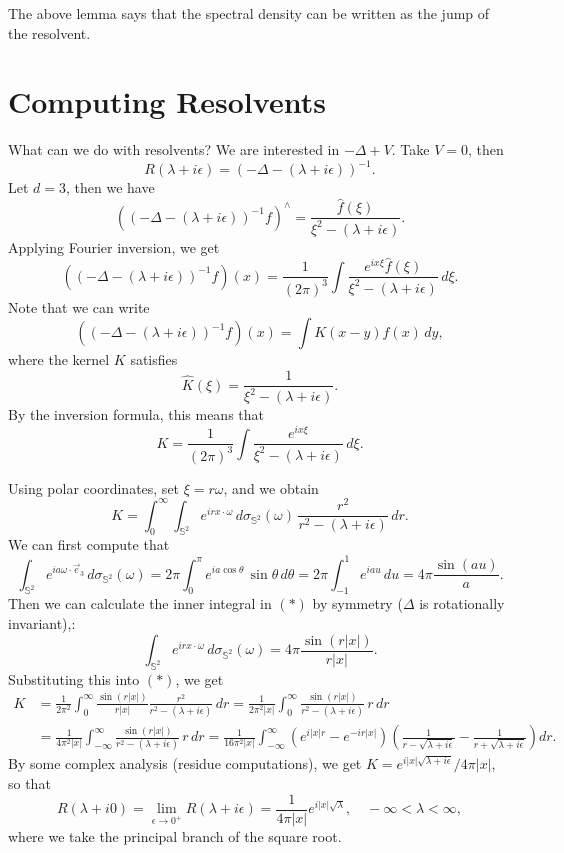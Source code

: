 \begin{remark}
  The above lemma says that the spectral density can
  be written as the jump of the resolvent.
\end{remark}

\section{Computing Resolvents}
\begin{remark}
  What can we do with resolvents? We are interested
  in $- \Delta + V$. Take $V = 0$, then
  \[
    R(\lambda + i\epsilon)
    = (-\Delta - (\lambda + i\epsilon))^{-1}.
  \]
  Let $d = 3$, then we have
  \[
    ((-\Delta - (\lambda + i\epsilon))^{-1} f)^\wedge
    = \frac{\widehat{f}(\xi)}{\xi^2 - (\lambda + i\epsilon)}.
  \]
  Applying Fourier inversion, we get
  \[
    ((-\Delta - (\lambda + i\epsilon))^{-1} f)(x)
    = \frac{1}{(2\pi)^3} \int \frac{e^{ix\xi} \widehat{f}(\xi)}{\xi^2 - (\lambda + i\epsilon)}\, d\xi.
  \]
  Note that we can write
  \[
    ((-\Delta - (\lambda + i\epsilon))^{-1} f)(x)
    = \int K(x - y) f(x)\, dy,
  \]
  where the kernel $K$ satisfies
  \[
    \widehat{K}(\xi) =
    \frac{1}{\xi^2 - (\lambda + i\epsilon)}.
  \]
  By the inversion formula, this means that
  \[
    K = \frac{1}{(2\pi)^3} \int \frac{e^{ix\xi}}{\xi^2 - (\lambda + i\epsilon)}\, d\xi.
  \]

  Using polar coordinates, set $\xi = r \omega$, and
  we obtain
  \[
    K
    = \int_0^\infty \int_{\mathbb{S}^2} e^{i r x \cdot \omega}\, d \sigma_{\mathbb{S}^2}(\omega)\,
    \frac{r^2}{r^2 - (\lambda + i\epsilon)}\, dr. \tag{$*$}
  \]
  We can first compute that
  \[
    \int_{\mathbb{S}^2} e^{ia \omega \cdot \vec{e}_3}\, d \sigma_{\mathbb{S}^2}(\omega)
    = 2\pi \int_0^\pi e^{ia \cos \theta}\, \sin \theta\, d\theta
    = 2\pi \int_{-1}^1 e^{ia u}\, du
    = 4\pi \frac{\sin(au)}{a}.
  \]
  Then we can calculate the inner integral in
  $(*)$ by symmetry ($\Delta$ is rotationally invariant),:
  \[
    \int_{\mathbb{S}^2} e^{i r x \cdot \omega}\, d \sigma_{\mathbb{S}^2}(\omega)
    = 4\pi \frac{\sin(r |x|)}{r |x|}.
  \]
  Substituting this into $(*)$, we get
  \begin{align*}
    K
    &= \frac{1}{2\pi^2} \int_0^\infty \frac{\sin(r |x|)}{r |x|} \frac{r^2}{r^2 - (\lambda + i\epsilon)}\, dr
    = \frac{1}{2\pi^2 |x|} \int_0^\infty \frac{\sin(r |x|)}{r^2 - (\lambda + i \epsilon)}\, r\, dr \\
    &= \frac{1}{4\pi^2 |x|} \int_{-\infty}^\infty \frac{\sin(r |x|)}{r^2 - (\lambda + i \epsilon)}\, r\, dr
    = \frac{1}{16 \pi^2 |x|} \int_{-\infty}^\infty
    (e^{i|x|r} - e^{-ir|x|}) \left(\frac{1}{r - \sqrt{\lambda + i\epsilon}} - \frac{1}{r + \sqrt{\lambda + i\epsilon}}\right) dr.
  \end{align*}
  By some complex analysis (residue computations),
  we get
  $K = e^{i|x| \sqrt{\lambda + i\epsilon}} / 4\pi |x|$,
  so that
  \[
    R(\lambda + i 0) = \lim_{\epsilon \to 0^+} R(\lambda + i\epsilon)
    = \frac{1}{4\pi |x|} e^{i|x| \sqrt{\lambda}},
    \quad -\infty < \lambda < \infty,
  \]
  where we take the principal branch of the square root.
\end{remark}
